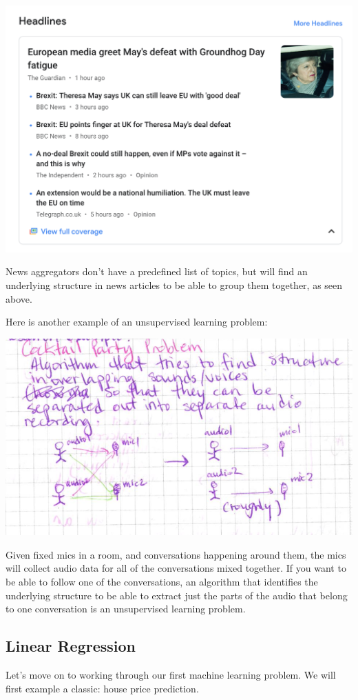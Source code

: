 \documentclass[12pt]{article}
\begin{document}
\includegraphics[width={\textwidth}]{google-news}

News aggregators don't have a predefined list of topics, but will find an underlying structure in news articles to be able to group them together, as seen above. 

Here is another example of an unsupervised learning problem:

\includegraphics[width={\textwidth}]{cocktail-party}

Given fixed mics in a room, and conversations happening around them, the mics will collect audio data for all of the conversations mixed together. If you want to be able to follow one of the conversations, an algorithm that identifies the underlying structure to be able to extract just the parts of the audio that belong to one conversation is an unsupervised learning problem.

\subsection{Linear Regression}
Let's move on to working through our first machine learning problem. We will first example a classic: house price prediction.
\end{document}

